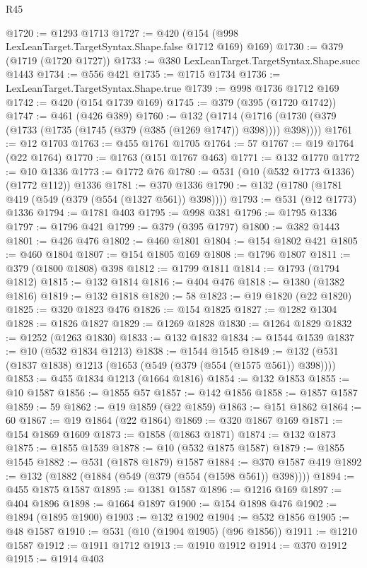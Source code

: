 \begin{lexlean}{R45}
\begin{coremodule}
@1720 := @1293 @1713
@1727 := @420 (@154 (@998 LexLeanTarget.TargetSyntax.Shape.false @1712 @169) @169)
@1730 := @379 (@1719 (@1720 @1727))
@1733 := @380 LexLeanTarget.TargetSyntax.Shape.succ @1443
@1734 := @556 @421
@1735 := @1715 @1734
@1736 := LexLeanTarget.TargetSyntax.Shape.true
@1739 := @998 @1736 @1712 @169
@1742 := @420 (@154 @1739 @169)
@1745 := @379 (@395 (@1720 @1742))
@1747 := @461 (@426 @389)
@1760 := @132
    (@1714 (@1716 (@1730 (@379 (@1733 (@1735 (@1745 (@379 (@385 (@1269 @1747)) @398)))) @398))))
@1761 := @12 @1703
@1763 := @455 @1761 @1705
@1764 := 57
@1767 := @19 @1764 (@22 @1764)
@1770 := @1763 (@151 @1767 @463)
@1771 := @132 @1770
@1772 := @10 @1336
@1773 := @1772 @76
@1780 := @531 (@10 (@532 @1773 @1336) (@1772 @112)) @1336
@1781 := @370 @1336
@1790 := @132 (@1780 (@1781 @419 (@549 (@379 (@554 (@1327 @561)) @398))))
@1793 := @531 (@12 @1773) @1336
@1794 := @1781 @403
@1795 := @998 @381
@1796 := @1795 @1336
@1797 := @1796 @421
@1799 := @379 (@395 @1797)
@1800 := @382 @1443
@1801 := @426 @476
@1802 := @460 @1801
@1804 := @154 @1802 @421
@1805 := @460 @1804
@1807 := @154 @1805 @169
@1808 := @1796 @1807
@1811 := @379 (@1800 @1808) @398
@1812 := @1799 @1811
@1814 := @1793 (@1794 @1812)
@1815 := @132 @1814
@1816 := @404 @476
@1818 := @1380 (@1382 @1816)
@1819 := @132 @1818
@1820 := 58
@1823 := @19 @1820 (@22 @1820)
@1825 := @320 @1823 @476
@1826 := @154 @1825
@1827 := @1282 @1304
@1828 := @1826 @1827
@1829 := @1269 @1828
@1830 := @1264 @1829
@1832 := @1252 (@1263 @1830)
@1833 := @132 @1832
@1834 := @1544 @1539
@1837 := @10 (@532 @1834 @1213)
@1838 := @1544 @1545
@1849 := @132 (@531 (@1837 @1838) @1213 (@1653 (@549 (@379 (@554 (@1575 @561)) @398))))
@1853 := @455 @1834 @1213 (@1664 @1816)
@1854 := @132 @1853
@1855 := @10 @1587
@1856 := @1855 @57
@1857 := @142 @1856
@1858 := @1857 @1587
@1859 := 59
@1862 := @19 @1859 (@22 @1859)
@1863 := @151 @1862
@1864 := 60
@1867 := @19 @1864 (@22 @1864)
@1869 := @320 @1867 @169
@1871 := @154 @1869 @1609
@1873 := @1858 (@1863 @1871)
@1874 := @132 @1873
@1875 := @1855 @1539
@1878 := @10 (@532 @1875 @1587)
@1879 := @1855 @1545
@1882 := @531 (@1878 @1879) @1587
@1884 := @370 @1587 @419
@1892 := @132 (@1882 (@1884 (@549 (@379 (@554 (@1598 @561)) @398))))
@1894 := @455 @1875 @1587
@1895 := @1381 @1587
@1896 := @1216 @169
@1897 := @404 @1896
@1898 := @1664 @1897
@1900 := @154 @1898 @476
@1902 := @1894 (@1895 @1900)
@1903 := @132 @1902
@1904 := @532 @1856
@1905 := @48 @1587
@1910 := @531 (@10 (@1904 @1905) (@96 @1856))
@1911 := @1210 @1587
@1912 := @1911 @1712
@1913 := @1910 @1912
@1914 := @370 @1912
@1915 := @1914 @403

\end{coremodule}
\end{lexlean}
